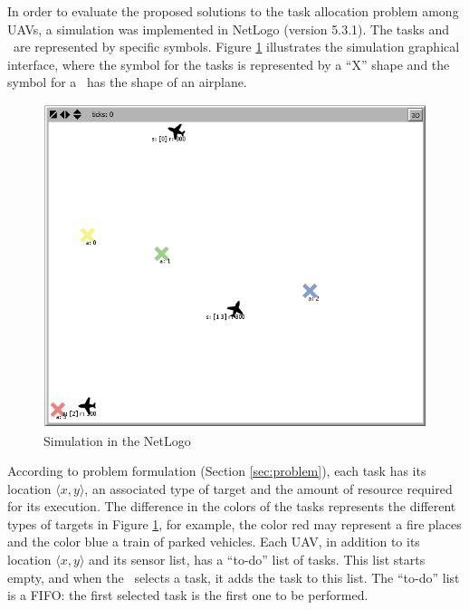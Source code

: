 In order to evaluate the proposed solutions to the task allocation problem among UAVs, a simulation was implemented in NetLogo\cite{tisue2004netlogo} (version 5.3.1). The tasks and \uavs\ are represented by specific symbols.
Figure \ref{fig:simulacao} illustrates the simulation graphical interface, where the symbol for the tasks is represented by a ``X'' shape and the symbol for a \uav\ has the shape of an airplane.

\begin{figure}[h!]
	\begin{center}
		\includegraphics[scale=0.50]{simulation.png}
		\caption{Simulation in the NetLogo}
		\label{fig:simulacao}
	\end{center}
\end{figure}

According to problem formulation (Section \ref{sec:problem}), each task has its location $\langle x,y \rangle$, an associated type of target and the amount of resource required for its execution. The difference in the colors of the tasks represents the different types of targets in Figure \ref{fig:simulacao}, for example, the color red may represent a fire places and the color blue a train of parked vehicles. Each UAV, in addition to its location $\langle x,y \rangle$ and its sensor list, has a ``to-do'' list of tasks. This list starts empty, and when the \uav\ selects a task, it adds the task to this list. 
The ``to-do'' list is a FIFO: the first selected task is the first one to be performed.

